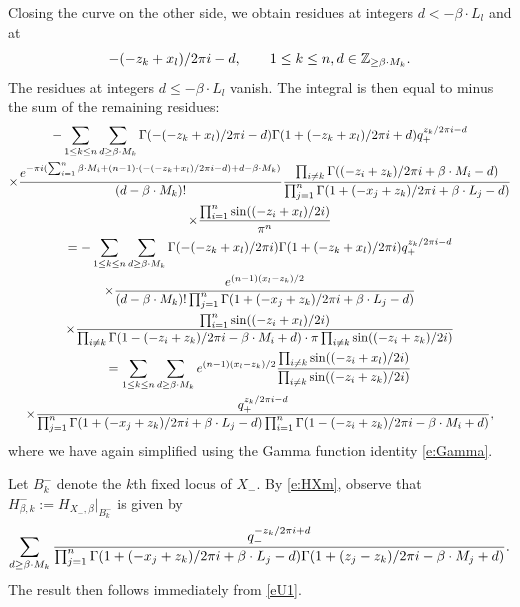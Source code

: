 \documentclass[11pt]{article}
\numberwithin{equation}{section}
\numberwithin{equation}{section}
\newcommand{\ZZ}{\mathbb{Z}}
\newcommand{\MB}{M}
\newcommand{\LB}{L}
\newcommand{\z}{z}
\newcommand{\x}{x}
\begin{document}
Closing the curve on the other side, we obtain residues at integers $d < -\beta \cdot \LB_l$ and at
\[
- (-\z_k+\x_l)/2 \pi {\rm i} - d,\qquad 1 \leq k \leq n, d \in \ZZ_{\geq \beta \cdot \MB_k}.
\]
The residues at integers $d \leq -\beta \cdot \LB_l$ vanish. The integral is then equal to minus the sum of the remaining residues:
\begin{gather*} %
 -\sum_{1 \leq k \leq n}
\sum_{d \geq \beta \cdot \MB_k}\Gamma(- (-\z_k+\x_l)/2 \pi {\rm i} -d) \Gamma(1 + (-\z_k+\x_l)/2 \pi {\rm i} + d) q_+^{ \z_k/2 \pi {\rm i}-d } \\ \nonumber
\times
\frac{ {\rm e}^{- \pi {\rm i} ( \sum_{i=1}^n \beta \cdot \MB_i + (n-1)\cdot ( - (-\z_k+\x_l)/2 \pi {\rm i} - d)+d- \beta \cdot \MB_k)}}{(d - \beta \cdot \MB_k)!}\frac{\prod_{i\neq k} \Gamma((-\z_i + \z_k)/2 \pi {\rm i} + \beta \cdot \MB_i -d)}
{\prod_{j=1}^n \Gamma(1 + (- \x_j+\z_k)/2 \pi {\rm i} + \beta \cdot \LB_j -d) }\\ \nonumber
\times
 \frac{ \prod_{i=1}^n \sin( (-\z_i+\x_l)/2 {\rm i}) }{\pi^n}
 \\ \nonumber
= -\sum_{1 \leq k \leq n}
\sum_{d \geq \beta \cdot \MB_k}\Gamma(- (-\z_k+\x_l)/2 \pi {\rm i} ) \Gamma(1 + (-\z_k+\x_l)/2 \pi {\rm i}) q_+^{ \z_k/2 \pi {\rm i}-d } \\ \nonumber
\times
\frac{ {\rm e}^{ (n-1) ( \x_l-\z_k)/2}}
{(d - \beta \cdot \MB_k)!\prod_{j=1}^n \Gamma(1 + (- \x_j+\z_k)/2 \pi {\rm i} + \beta \cdot \LB_j -d) }\\ \nonumber
\times
 \frac{ \prod_{i=1}^n \sin( (-\z_i+\x_l)/2 {\rm i}) }{\prod_{i \neq k} \Gamma(1 - (-\z_i +\z_k)/2 \pi {\rm i} - \beta \cdot \MB_i + d) \cdot \pi \prod_{i \neq k}\sin((-\z_i + \z_k)/2 {\rm i})}
\\ \nonumber
 = \sum_{1 \leq k \leq n}
\sum_{d \geq \beta \cdot \MB_k} {\rm e}^{ (n-1) ( \x_l-\z_k)/2}\frac{ \prod_{i\neq k} \sin( (-\z_i+\x_l)/2 {\rm i}) }{\prod_{i \neq k}\sin((-\z_i + \z_k)/2 {\rm i})} \\
\times
\frac{q_+^{ \z_k/2 \pi {\rm i}-d } }
{\prod_{j=1}^n \Gamma(1 + (- \x_j+\z_k)/2 \pi {\rm i} + \beta \cdot \LB_j -d) \prod_{i =1}^n \Gamma(1 - (-\z_i +\z_k)/2 \pi {\rm i} - \beta \cdot \MB_i + d)}, \nonumber
\end{gather*}
where we have again simplified using the Gamma function identity \eqref{e:Gamma}.

Let $B_k^{-}$ denote the $k$th fixed locus of $X_{-}$. By \eqref{e:HXm}, observe
that $H_{\beta, k}^{-} := H_{X_{-}, \beta}|_{B_k^{-}}$ is given by
\[
\sum_{d \geq \beta \cdot \MB_k} \frac{ q_-^{-\z_k/2 \pi {\rm i}+d}}
{\prod_{j=1}^n \Gamma(1 + (- \x_j +\z_k)/2 \pi {\rm i} + \beta \cdot \LB_j-d)\Gamma(1 + (\z_j -\z_k)/2 \pi {\rm i} - \beta \cdot \MB_j + d)}.
\]
The result then follows immediately from \eqref{eU1}.
\end{document}
